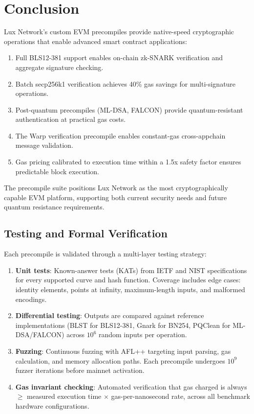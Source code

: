 \section{Conclusion}
\label{sec:conclusion}

Lux Network's custom EVM precompiles provide native-speed cryptographic operations that enable advanced smart contract applications:

\begin{enumerate}
    \item Full BLS12-381 support enables on-chain zk-SNARK verification and aggregate signature checking.
    \item Batch secp256k1 verification achieves 40\% gas savings for multi-signature operations.
    \item Post-quantum precompiles (ML-DSA, FALCON) provide quantum-resistant authentication at practical gas costs.
    \item The Warp verification precompile enables constant-gas cross-appchain message validation.
    \item Gas pricing calibrated to execution time within a 1.5x safety factor ensures predictable block execution.
\end{enumerate}

The precompile suite positions Lux Network as the most cryptographically capable EVM platform, supporting both current security needs and future quantum resistance requirements.

\subsection{Testing and Formal Verification}

Each precompile is validated through a multi-layer testing strategy:

\begin{enumerate}
    \item \textbf{Unit tests}: Known-answer tests (KATs) from IETF and NIST specifications for every supported curve and hash function. Coverage includes edge cases: identity elements, points at infinity, maximum-length inputs, and malformed encodings.
    \item \textbf{Differential testing}: Outputs are compared against reference implementations (BLST for BLS12-381, Gnark for BN254, PQClean for ML-DSA/FALCON) across $10^6$ random inputs per operation.
    \item \textbf{Fuzzing}: Continuous fuzzing with AFL++ targeting input parsing, gas calculation, and memory allocation paths. Each precompile undergoes $10^9$ fuzzer iterations before mainnet activation.
    \item \textbf{Gas invariant checking}: Automated verification that gas charged is always $\geq$ measured execution time $\times$ gas-per-nanosecond rate, across all benchmark hardware configurations.
\end{enumerate}

